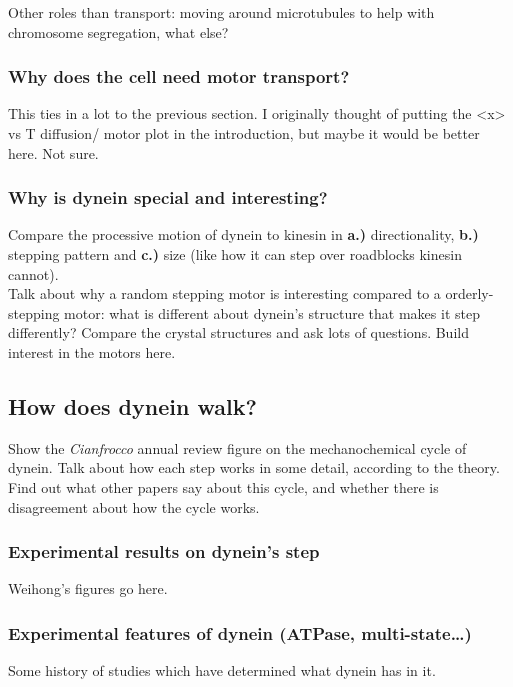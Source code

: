 \documentclass[10pt]{article} %
\begin{document}
Other roles than transport: moving around microtubules to help with chromosome segregation, what else?

\subsubsection{Why does the cell need motor transport?}
This ties in a lot to the previous section. I originally thought of putting the <x> vs T diffusion/
motor plot in the introduction, but maybe it would be better here. Not sure.\\

\subsubsection{Why is dynein special and interesting?}
Compare the processive motion of dynein to kinesin in \textbf{a.)} directionality, \textbf{b.)}
stepping pattern and \textbf{c.)} size (like how it can step over roadblocks kinesin cannot).\\

Talk about why a random stepping motor is interesting compared to a orderly-stepping motor: what
is different about dynein's structure that makes it step differently? Compare the crystal structures
and ask lots of questions. Build interest in the motors here.\\

\subsection{How does dynein walk?}
Show the \textit{Cianfrocco} annual review figure on the mechanochemical cycle of dynein. Talk about
how each step works in some detail, according to the theory. Find out what other papers say about
this cycle, and whether there is disagreement about how the cycle works.


\subsubsection{Experimental results on dynein’s step}
Weihong's figures go here.\\
\subsubsection{Experimental features of dynein (ATPase, multi-state…)}
Some history of studies which have determined what dynein has in it.\\
\end{document}
